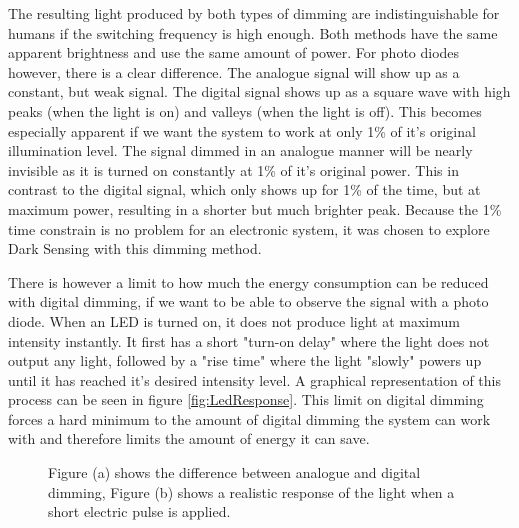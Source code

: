The resulting light produced by both types of dimming are indistinguishable for humans if the switching frequency is high enough. Both methods have the same apparent brightness and use the same amount of power. For photo diodes however, there is a clear difference. The analogue signal will show up as a constant, but weak signal. The digital signal shows up as a square wave with high peaks (when the light is on) and valleys (when the light is off). This becomes especially apparent if we want the system to work at only 1\% of it's original illumination level. The signal dimmed in an analogue manner will be nearly invisible as it is turned on constantly at 1\% of it's original power. This in contrast to the digital signal, which only shows up for 1\% of the time, but at maximum power, resulting in a shorter but much brighter peak. Because the 1\% time constrain is no problem for an electronic system, it was chosen to explore Dark Sensing with this dimming method.

There is however a limit to how much the energy consumption can be reduced with digital dimming, if we want to be able to observe the signal with a photo diode. When an LED is turned on, it does not produce light at maximum intensity instantly\cite{LED_on}. It first has a short "turn-on delay" where the light does not output any light, followed by a "rise time" where the light "slowly" powers up until it has reached it's desired intensity level. A graphical representation of this process can be seen in figure \ref{fig:LedResponse}. This limit on digital dimming forces a hard minimum to the amount of digital dimming the system can work with and therefore limits the amount of energy it can save.

\begin{figure}[]
	\caption{Figure (a) shows the difference between analogue and digital dimming, Figure (b) shows a realistic response of the light when a short electric pulse is applied\cite{LED_on}.\label{fig:LedOnTime}}
\end{figure}

